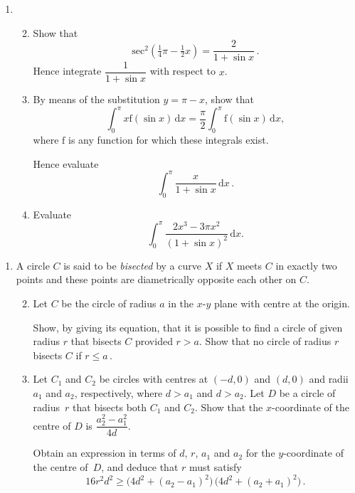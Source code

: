 \documentclass[a4, 11pt]{report}
\newlength{\qspace}
\newcounter{qnumber}
\newenvironment{question}%
 {\vspace{\qspace}
  \begin{enumerate}[\bfseries 1\quad][10]%
    \setcounter{enumi}{\value{qnumber}}%
    \item%
 }
{
  \end{enumerate}
  \filbreak
  \stepcounter{qnumber}
 }
\newenvironment{questionparts}[1][1]%
 {
  \begin{enumerate}[\bfseries (i)]%
    \setcounter{enumii}{#1}
    \addtocounter{enumii}{-1}
    \setlength{\itemsep}{5mm}
    \setlength{\parskip}{8pt}
 }
 {
  \end{enumerate}
 }
\def\d{{\mathrm d}}
\def\f{{\mathrm f}}
\def\le{\leqslant}
\def\ge{\geqslant}
\renewcommand{\.}[1]{\ensuremath{\mathrm{#1}}}
\newcommand{\+}[1]{\ensuremath{\mathbf{#1}}}
\begin{document}
\begin{question}
\begin{questionparts}
\item Show that  
\[ \mathrm{sec}^2\left(\tfrac14\pi-\tfrac12 x\right)=\frac{2}{1+\sin x} \,.
\]
Hence integrate $\dfrac{1}{1+\sin x}$ with respect to $x$.

\item By means of the substitution $y=\pi -x$,  show that
\[
\int_0^\pi x  \f (\sin x)\, \d x = \frac \pi 2 \int_0^\pi \f(\sin x) \, \d x
,\]
where $\mathrm{f}$ is any function for which these integrals exist.

Hence evaluate
\[
\int_0^\pi \frac x {1+\sin x} \, \d x
\,.
\]

\item Evaluate
\[
\int_0^\pi\frac{ 2x^3 -3\pi x^2}{(1+\sin x)^2}\,   \d x
.\]
\end{questionparts}
\end{question}
	
\begin{question}
A circle $C$ is said to be {\em bisected} by a curve $X$ if $X$ meets $C$ in exactly two points and these points are diametrically opposite each other on $C$.

\begin{questionparts}

\item Let $C$ be the  circle of radius $a$  in the $x$-$y$ plane with centre at the origin.

Show, by giving its equation, that it is possible to find a circle of given radius $r$ that bisects $C$ provided  $r>a$. Show that no circle of radius $r$ bisects $C$ if $r\le a\,$.

\item Let $C_1$ and $C_2$ be circles with centres at $(-d,0)$ and $(d,0)$ and radii $a_1$ and $a_2$, respectively, where $d>a_1$ and $d>a_2$. Let $D$ be a  circle of radius~$r$ that bisects both $C_1$ and $C_2$. Show that the $x$-coordinate of the centre of $D$ is $\dfrac{a_2^2 - a_1^2}{4d}$.

Obtain an expression in terms of $d$, $r$, $a_1$ and $a_2$ for the $y$-coordinate of the centre of~$D$, and deduce that $r$ must satisfy
\[
16r^2d^2 \ge \big (4d^2 +(a_2-a_1)^2\big) \, \big (4d^2 +(a_2+a_1)^2\big) 
\,.
\]

\end{questionparts}
\end{question}
		
\end{document}
